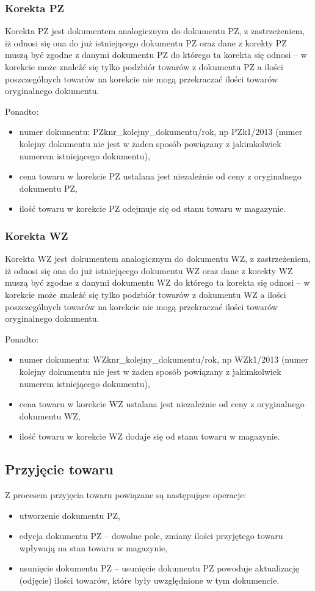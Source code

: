 \subsubsection{Korekta PZ}
Korekta PZ jest dokumentem analogicznym do dokumentu PZ, z zastrzeżeniem, iż odnosi się ona do już istniejącego dokumentu PZ oraz dane z korekty PZ muszą być zgodne z danymi dokumentu PZ do którego ta korekta się odnosi -- w korekcie może znaleźć się tylko podzbiór towarów z dokumentu PZ a ilości poszczególnych towarów na korekcie nie mogą przekraczać ilości towarów oryginalnego dokumentu.

Ponadto:
\begin{itemize}
	\item numer dokumentu: PZknr\_kolejny\_dokumentu/rok, np PZk1/2013 (numer kolejny dokumentu nie jest w żaden sposób powiązany z jakimkolwiek numerem istniejącego dokumentu),
	\item cena towaru w korekcie PZ ustalana jest niezależnie od ceny z oryginalnego dokumentu PZ,
	\item ilość towaru w korekcie PZ odejmuje się od stanu towaru w magazynie.
\end{itemize}

\subsubsection{Korekta WZ}
Korekta WZ jest dokumentem analogicznym do dokumentu WZ, z zastrzeżeniem, iż odnosi się ona do już istniejącego dokumentu WZ oraz dane z korekty WZ muszą być zgodne z danymi dokumentu WZ do którego ta korekta się odnosi -- w korekcie może znaleźć się tylko podzbiór towarów z dokumentu WZ a ilości poszczególnych towarów na korekcie nie mogą przekraczać ilości towarów oryginalnego dokumentu.

Ponadto:
\begin{itemize}
	\item numer dokumentu: WZknr\_kolejny\_dokumentu/rok, np WZk1/2013 (numer kolejny dokumentu nie jest w żaden sposób powiązany z jakimkolwiek numerem istniejącego dokumentu),
	\item cena towaru w korekcie WZ ustalana jest niezależnie od ceny z oryginalnego dokumentu WZ,
	\item ilość towaru w korekcie WZ dodaje się od stanu towaru w magazynie.
\end{itemize}

\subsection{Przyjęcie towaru}
Z procesem przyjęcia towaru powiązane są następujące operacje:
\begin{itemize}
	\item utworzenie dokumentu PZ,
	\item edycja dokumentu PZ -- dowolne pole, zmiany ilości przyjętego towaru wpływają na stan towaru w magazynie,
	\item usunięcie dokumentu PZ -- usunięcie dokumentu PZ powoduje aktualizację (odjęcie) ilości towarów, które były uwzględnione w tym dokumencie.
\end{itemize}

